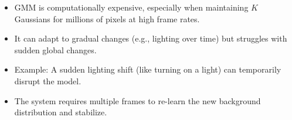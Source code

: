 \documentclass[12pt]{article}
\begin{document}
\begin{itemize}
    \item GMM is computationally expensive, especially when maintaining $K$ Gaussians for millions of pixels at high frame rates.

    \item It can adapt to gradual changes (e.g., lighting over time) but struggles with sudden global changes.

    \item Example: A sudden lighting shift (like turning on a light) can temporarily disrupt the model.

    \item The system requires multiple frames to re-learn the new background distribution and stabilize.
\end{itemize}
\end{document}

